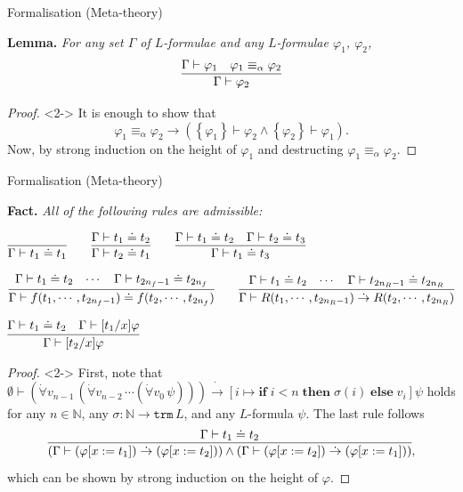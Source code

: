 \documentclass[serif,table,10pt]{beamer}
\newcommand{\IN}{\mathbb{N}}
\newcommand{\0}{\texttt{0}}
\newcommand{\1}{\texttt{1}}
\newcommand{\Leq}{\mathrel{\dot{=}}}
\newcommand{\Lto}{\mathrel{\dot{\to}}}
\newcommand{\Lall}[1]{\dot{\forall}#1\,}
\begin{document}
\begin{frame}{Formalisation (Meta-theory)}

    \textbf{Lemma.}
    \emph{For any set $\Gamma$ of $L$-formulae and any $L$-formulae $\varphi_1$, $\varphi_2$, $$ \infer{\Gamma \vdash \varphi_2}{\Gamma \vdash \varphi_1 & \varphi_1 \equiv_\alpha \varphi_2} $$}

    \begin{proof}<2->
        It is enough to show that $$ \varphi_1 \equiv_\alpha \varphi_2 \to ( \left\{ \varphi_1 \right\} \vdash \varphi_2 \land \left\{ \varphi_2 \right\} \vdash \varphi_1 ) . $$
        Now, by strong induction on the height of $\varphi_1$ and destructing $ \varphi_1 \equiv_\alpha \varphi_2 $.
    \end{proof}

\end{frame}

\begin{frame}{Formalisation (Meta-theory)}

    \textbf{Fact.}
    \emph{All of the following rules are admissible:}

    \begin{center} \small
        $ \infer{\Gamma \vdash t_1 \Leq t_1}{} \qquad \infer{\Gamma \vdash t_2 \Leq t_1}{\Gamma \vdash t_1 \Leq t_2} \qquad \infer{\Gamma \vdash t_1 \Leq t_3}{\Gamma \vdash t_1 \Leq t_2 & \Gamma \vdash t_2 \Leq t_3} $
    \end{center}
    \begin{center} \small
        $ \infer{\Gamma \vdash f (t_1, \cdots , t_{2 n_f - 1}) \Leq f (t_2 , \cdots , t_{2 n_f})}{\Gamma \vdash t_1 \Leq t_2 & \cdots & \Gamma \vdash t_{2 n_f - 1} \Leq t_{2 n_f}} \qquad \infer{\Gamma \vdash R (t_1, \cdots , t_{2 n_R - 1}) \Lto R (t_2 , \cdots , t_{2 n_R})}{\Gamma \vdash t_1 \Leq t_2 & \cdots & \Gamma \vdash t_{2 n_R - 1} \Leq t_{2 n_R}} $
    \end{center}
    \begin{center} \small
        $ \infer{\Gamma \vdash [t_2 / x] \varphi}{\Gamma \vdash t_1 \Leq t_2 & \Gamma \vdash [t_1 / x] \varphi} $
    \end{center}

    \begin{proof}<2-> \small
        First, note that $ \emptyset \vdash ( \Lall{v_{n-1}} ( \Lall{v_{n-2}} \cdots ( \Lall{v_0} \psi ) ) ) \Lto [ i \mapsto \mathbf{if} \; i < n \; \mathbf{then} \; \sigma ( i ) \; \mathbf{else} \; v_i ] \psi $ holds for any $n \in \IN$, any $\sigma : \IN \to \mathtt{trm} \, L$, and any $L$-formula $\psi$.
        The last rule follows \[ \infer{(\Gamma \vdash (\varphi [ x := t_1 ]) \Lto (\varphi [ x := t_2 ]) ) \land ( \Gamma \vdash (\varphi [ x := t_2 ]) \Lto (\varphi [ x := t_1 ]) )}{\Gamma \vdash t_1 \Leq t_2} , \] which can be shown by strong induction on the height of $\varphi$.
    \end{proof}

\end{frame}
\end{document}
